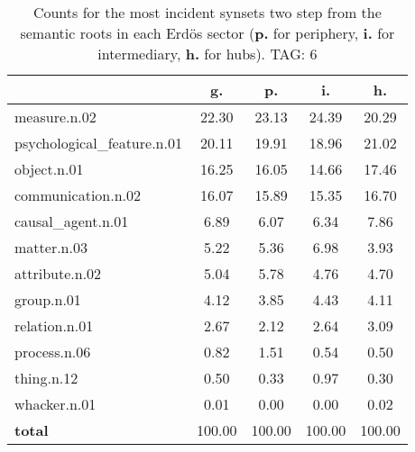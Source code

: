 \begin{table}[h!]
\begin{center}
\begin{tabular}{| l || c | c | c | c |}\hline
 & {\bf g.} & {\bf p.} & {\bf i.} & {\bf h.} \\\hline\hline
measure.n.02 & 22.30  & 23.13  & 24.39  & 20.29 \\\hline
psychological\_feature.n.01 & 20.11  & 19.91  & 18.96  & 21.02 \\\hline
object.n.01 & 16.25  & 16.05  & 14.66  & 17.46 \\\hline
communication.n.02 & 16.07  & 15.89  & 15.35  & 16.70 \\\hline
causal\_agent.n.01 & 6.89  & 6.07  & 6.34  & 7.86 \\\hline
matter.n.03 & 5.22  & 5.36  & 6.98  & 3.93 \\\hline
attribute.n.02 & 5.04  & 5.78  & 4.76  & 4.70 \\\hline
group.n.01 & 4.12  & 3.85  & 4.43  & 4.11 \\\hline
relation.n.01 & 2.67  & 2.12  & 2.64  & 3.09 \\\hline
process.n.06 & 0.82  & 1.51  & 0.54  & 0.50 \\\hline
thing.n.12 & 0.50  & 0.33  & 0.97  & 0.30 \\\hline
whacker.n.01 & 0.01  & 0.00  & 0.00  & 0.02 \\\hline\hline
{{\bf total}} & 100.00  & 100.00  & 100.00  & 100.00 \\\hline
\end{tabular}
\caption{Counts for the most incident synsets two step from the semantic roots in each Erd\"os sector ({\bf p.} for periphery, {\bf i.} for intermediary, {\bf h.} for hubs). TAG: 6}
\end{center}
\end{table}